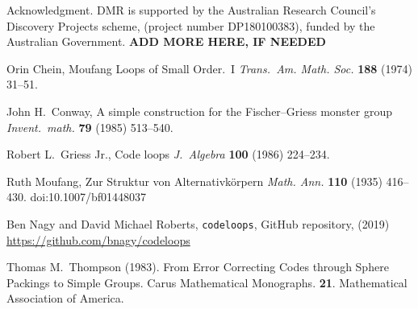 \documentclass{article}
\theoremstyle{plain}
\newtheorem{theorem}{Theorem}
\theoremstyle{definition}
\newtheorem*{definition}{Definition}
\newtheorem*{remark}{Remark}
\begin{document}






\begin{acknowledgment}{Acknowledgment.}
DMR is supported by the Australian Research Council's Discovery Projects scheme, (project number DP180100383), funded by the Australian Government. \textbf{ADD MORE HERE, IF NEEDED}
\end{acknowledgment}

\begin{thebibliography}{1}

Orin Chein, Moufang Loops of Small Order.\ I \emph{Trans.\ Am. Math. Soc.} \textbf{188} (1974) 31--51.

 John H.\ Conway, A simple construction for the Fischer--Griess monster group \emph{Invent.\ math.} \textbf{79} (1985) 513--540.

 Robert L.\ Griess Jr., Code loops \emph{J.\ Algebra} \textbf{100} (1986) 224--234.

 Ruth Moufang, Zur Struktur von Alternativk\"orpern \emph{Math. Ann.} \textbf{110} (1935) 416--430. doi:10.1007/bf01448037

 Ben Nagy and David Michael Roberts, \texttt{codeloops}, GitHub repository, (2019) \url{https://github.com/bnagy/codeloops}

 Thomas M.\ Thompson (1983). From Error Correcting Codes through Sphere Packings to Simple Groups. Carus Mathematical Monographs. \textbf{21}. Mathematical Association of America. 

\end{thebibliography}
\end{document}
